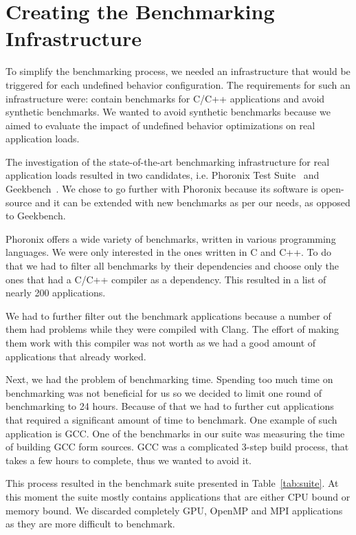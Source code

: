 \section{Creating the Benchmarking Infrastructure} \label{sec:benchmarks}

To simplify the benchmarking process, we needed an infrastructure that would be
triggered for each undefined behavior configuration. The requirements for such
an infrastructure were: contain benchmarks for C/C++ applications and avoid
synthetic benchmarks. We wanted to avoid synthetic benchmarks because we aimed
to evaluate the impact of undefined behavior optimizations on real application
loads.

The investigation of the state-of-the-art benchmarking infrastructure for real
application loads resulted in two candidates, i.e. Phoronix Test
Suite~\cite{phoronix} and Geekbench~\cite{geekbench}. We chose to go further
with Phoronix because its software is open-source and it can be extended with
new benchmarks as per our needs, as opposed to Geekbench.

Phoronix offers a wide variety of benchmarks, written in various programming
languages. We were only interested in the ones written in C and C++. To do that
we had to filter all benchmarks by their dependencies and choose only the ones
that had a C/C++ compiler as a dependency. This resulted in a list of nearly 200
applications.

We had to further filter out the benchmark applications because a number of them
had problems while they were compiled with Clang. The effort of making them work
with this compiler was not worth as we had a good amount of applications that
already worked.

Next, we had the problem of benchmarking time. Spending too much time on
benchmarking was not beneficial for us so we decided to limit one round of
benchmarking to 24 hours. Because of that we had to further cut applications
that required a significant amount of time to benchmark. One example of such
application is GCC. One of the benchmarks in our suite was measuring the time of
building GCC form sources. GCC was a complicated 3-step build process, that
takes a few hours to complete, thus we wanted to avoid it.

This process resulted in the benchmark suite presented in Table~\ref{tab:suite}.
At this moment the suite mostly  contains applications that are either CPU bound
or memory bound. We discarded completely GPU, OpenMP and MPI applications as they
are more difficult to benchmark.
